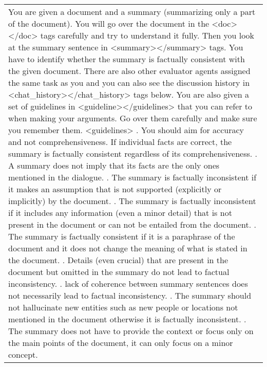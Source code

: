\begin{table*}
\centering
\small
\begin{tabular}{@{}p{14cm}@{}}
\toprule
You are given a document and a summary (summarizing only a part of the document). You will go over the document in the <doc></doc> tags carefully and try to understand it fully. Then you look at the summary sentence in <summary></summary> tags. You have to identify whether the summary is factually consistent with the given document. There are also other evaluator agents assigned the same task as you and you can also see the discussion history in <chat\_history></chat\_history> tags below. You are also given a set of guidelines in <guideline></guidelines> that you can refer to when making your arguments. Go over them carefully and make sure you remember them.
\newline
\newline
<guidelines>
\newline
    1. You should aim for accuracy and not comprehensiveness. If individual facts are correct, the summary is factually consistent regardless of its comprehensiveness.
    \newline
    2. A summary does not imply that its facts are the only ones mentioned in the dialogue.
    \newline
    3. The summary is factually inconsistent if it makes an assumption that is not supported (explicitly or implicitly) by the document.
    \newline
    4. The summary is factually inconsistent if it includes any information (even a minor detail) that is not present in the document or can not be entailed from the document.
    \newline
    5. The summary is factually consistent if it is a paraphrase of the document and it does not change the meaning of what is stated in the document.
    \newline
    6. Details (even crucial) that are present in the document but omitted in the summary do not lead to factual inconsistency.
    \newline
    7. lack of coherence between summary sentences does not necessarily lead to factual inconsistency.
    \newline
    8. The summary should not hallucinate new entities such as new people or locations not mentioned in the document otherwise it is factually inconsistent.
    \newline
    9. The summary does not have to provide the context or focus only on the main points of the document, it can only focus on a minor concept.

\end{tabular}
\end{table*}
